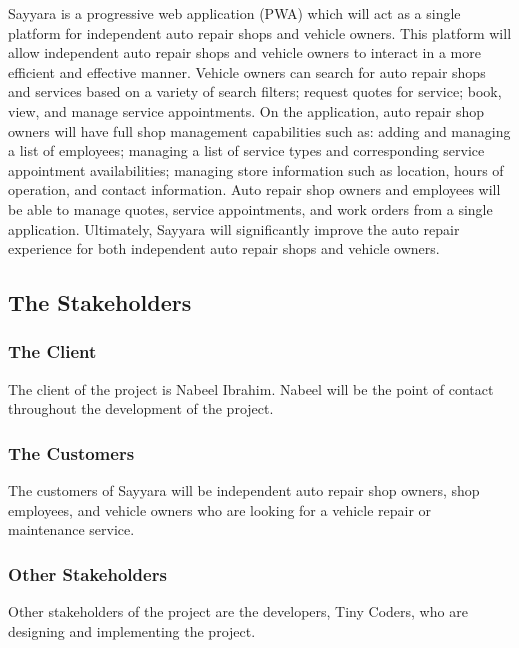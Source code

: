\documentclass[12pt]{article}
\begin{document}
Sayyara is a progressive web application (PWA) which will act as a single platform for independent
auto repair shops and vehicle owners. This platform will allow independent auto repair shops and
vehicle owners to interact in a more efficient and effective manner. Vehicle owners can search for
auto repair shops and services based on a variety of search filters; request quotes for service;
book, view, and manage service appointments. On the application, auto repair shop owners will have
full shop management capabilities such as: adding and managing a list of employees; managing a list
of service types and corresponding service appointment availabilities; managing store information
such as location, hours of operation, and contact information. Auto repair shop owners and
employees will be able to manage quotes, service appointments, and work orders from a single
application. Ultimately, Sayyara will significantly improve the auto repair experience for both
independent auto repair shops and vehicle owners.

\subsection{The Stakeholders}

\subsubsection{The Client}
The client of the project is Nabeel Ibrahim. Nabeel will be the point of contact throughout the
development of the project.

\subsubsection{The Customers}
The customers of Sayyara will be independent auto repair shop owners, shop employees, and vehicle
owners who are looking for a vehicle repair or maintenance service.

\subsubsection{Other Stakeholders}
Other stakeholders of the project are the developers, Tiny Coders, who are designing and
implementing the project.
\end{document}
